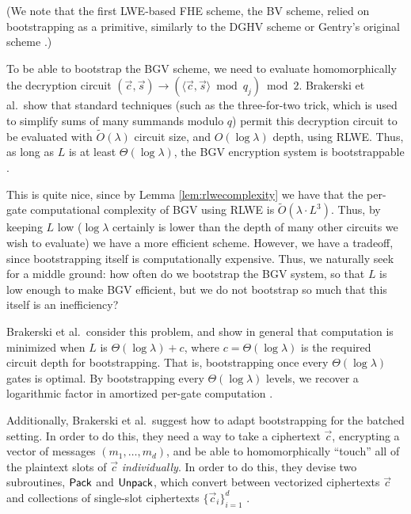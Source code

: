         (We note that the first LWE-based FHE scheme, the BV scheme, relied on bootstrapping as a primitive, similarly to the DGHV scheme or Gentry's original scheme \cite{bv2011}.)


        To be able to bootstrap the BGV scheme, we need to evaluate homomorphically the decryption circuit $(\vec{c}, \vec{s}) \to (\langle \vec{c}, \vec{s} \rangle \bmod q_j) \bmod 2$. Brakerski et al.~show that standard techniques (such as the three-for-two trick, which is used to simplify sums of many summands modulo $q$) permit this decryption circuit to be evaluated with $\widetilde{O}(\lambda)$ circuit size, and $O(\log \lambda)$ depth, using RLWE. Thus, as long as $L$ is at least $\Theta(\log \lambda)$, the BGV encryption system is bootstrappable \cite{bgv2011}.


        This is quite nice, since by Lemma \ref{lem:rlwecomplexity} we have that the per-gate computational complexity of BGV using RLWE is $\widetilde{O}(\lambda \cdot L^3)$. Thus, by keeping $L$ low ($\log \lambda$ certainly is lower than the depth of many other circuits we wish to evaluate) we have a more efficient scheme. However, we have a tradeoff, since bootstrapping itself is computationally expensive. Thus, we naturally seek for a middle ground: how often do we bootstrap the BGV system, so that $L$ is low enough to make BGV efficient, but we do not bootstrap so much that this itself is an inefficiency?

        Brakerski et al.~consider this problem, and show in general that computation is minimized when $L$ is $\Theta(\log \lambda) + c$, where $c = \Theta(\log \lambda)$ is the required circuit depth for bootstrapping. That is, bootstrapping once every $\Theta(\log \lambda)$ gates is optimal. By bootstrapping every $\Theta(\log \lambda)$ levels, we recover a logarithmic factor in amortized per-gate computation \cite{bgv2011}.

        Additionally, Brakerski et al.~suggest how to adapt bootstrapping for the batched setting. In order to do this, they need a way to take a ciphertext $\vec{c}$, encrypting a vector of messages $(m_1, \dots, m_d)$, and be able to homomorphically ``touch'' all of the plaintext slots of $\vec{c}$ \emph{individually}. In order to do this, they devise two subroutines, ${\sf Pack}$ and ${\sf Unpack}$, which convert between vectorized ciphertexts $\vec{c}$ and collections of single-slot ciphertexts $\{\vec{c}_i\}_{i = 1}^d$ \cite{bgv2011}.

